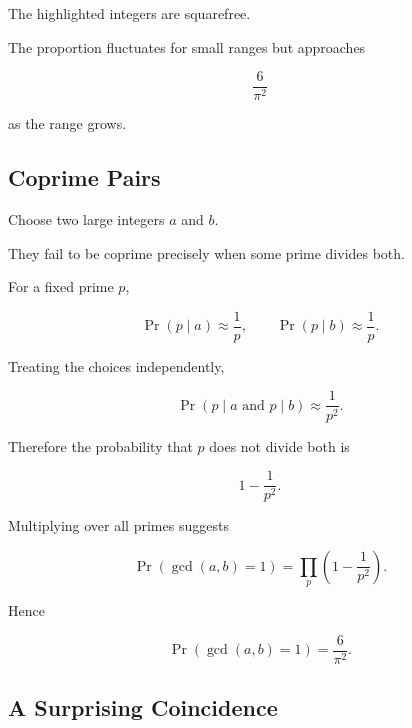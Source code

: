 \begin{centereddiagram}
\end{centereddiagram}

The highlighted integers are squarefree.

The proportion fluctuates for small ranges but approaches

\[ \frac6{\pi^2} \]

as the range grows.

\subsection{Coprime Pairs}
\label{subsec:probabilistic-coprime-pairs}

Choose two large integers \(a\) and \(b\).

They fail to be coprime precisely when some prime divides both.

For a fixed prime \(p\),

\[ \Pr(p\mid a)\approx\frac1p,\qquad \Pr(p\mid b)\approx\frac1p. \]

Treating the choices independently,

\[ \Pr(p\mid a\text{ and }p\mid b)\approx\frac1{p^2}. \]

Therefore the probability that \(p\) does not divide both is

\[ 1-\frac1{p^2}. \]

Multiplying over all primes suggests

\[ \Pr(\gcd(a,b)=1)=\prod_p\left(1-\frac1{p^2}\right). \]

Hence

\[ \boxed{\Pr(\gcd(a,b)=1)=\frac6{\pi^2}.} \]

\subsection{A Surprising Coincidence}
\label{subsec:squarefree-coprime-coincidence}

